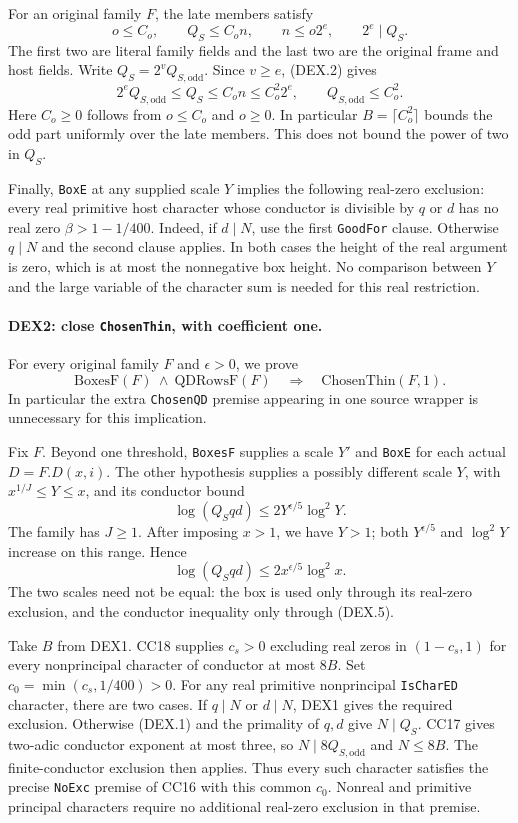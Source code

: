 \documentclass[11pt,a4paper]{article}
\numberwithin{equation}{section}
\theoremstyle{remark}\newtheorem{remark}[theorem]{Remark}
\begin{document}
For an original family $F$, the late members satisfy
\[
 o\le C_o,\qquad Q_S\le C_o n,\qquad
 n\le o2^e,\qquad 2^e\mid Q_S .                           \tag{DEX.2}
\]
The first two are literal family fields and the last two are the
original frame and host fields. Write $Q_S=2^vQ_{S,\mathrm{odd}}$.
Since $v\ge e$, (DEX.2) gives
\[
 2^eQ_{S,\mathrm{odd}}\le Q_S
       \le C_on\le C_o^2 2^e,
 \qquad Q_{S,\mathrm{odd}}\le C_o^2.                      \tag{DEX.3}
\]
Here $C_o\ge0$ follows from $o\le C_o$ and $o\ge0$.
In particular $B=\lceil C_o^2\rceil$ bounds the odd part uniformly
over the late members. This does not bound the power of two in $Q_S$.

Finally, \texttt{BoxE} at any supplied scale $Y$ implies the following
real-zero exclusion: every real primitive host character whose conductor
is divisible by $q$ or $d$ has no real zero $\beta>1-1/400$.
Indeed, if $d\mid N$, use the first \texttt{GoodFor} clause. Otherwise
$q\mid N$ and the second clause applies. In both cases the height of the
real argument is zero, which is at most the nonnegative box height.
No comparison between $Y$ and the large variable of the character sum is
needed for this real restriction.

\paragraph{DEX2: close \texttt{ChosenThin}, with coefficient one.}
\label{claim:DEX2}
For every original family $F$ and $\epsilon>0$, we prove
\[
 \mathrm{BoxesF}(F)\ \wedge\ \mathrm{QDRowsF}(F)
               \quad\Longrightarrow\quad
                         \mathrm{ChosenThin}(F,1).       \tag{DEX.4}
\]
In particular the extra \texttt{ChosenQD} premise appearing in one
source wrapper is unnecessary for this implication.

Fix $F$. Beyond one threshold, \texttt{BoxesF} supplies a scale $Y'$
and \texttt{BoxE} for each actual $D=F.D(x,i)$. The other hypothesis
supplies a possibly different scale $Y$, with
$x^{1/J}\le Y\le x$, and its conductor bound
\[
       \log(Q_Sqd)\le2Y^{\epsilon/5}\log^2Y.
\]
The family has $J\ge1$. After imposing $x>1$, we have $Y>1$;
both $Y^{\epsilon/5}$ and $\log^2Y$ increase on this range. Hence
\[
                     \log(Q_Sqd)
                         \le2x^{\epsilon/5}\log^2x.      \tag{DEX.5}
\]
The two scales need not be equal: the box is used only through its
real-zero exclusion, and the conductor inequality only through (DEX.5).

Take $B$ from DEX1. CC18 supplies $c_s>0$ excluding real zeros in
$(1-c_s,1)$ for every nonprincipal character of conductor at most $8B$.
Set $c_0=\min(c_s,1/400)>0$. For any real primitive nonprincipal
\texttt{IsCharED} character, there are two cases. If $q\mid N$ or
$d\mid N$, DEX1 gives the required exclusion. Otherwise (DEX.1) and
the primality of $q,d$ give $N\mid Q_S$. CC17 gives two-adic conductor
exponent at most three, so $N\mid8Q_{S,\mathrm{odd}}$ and $N\le8B$.
The finite-conductor exclusion then applies. Thus every such character
satisfies the precise \texttt{NoExc} premise of CC16 with this common
$c_0$. Nonreal and primitive principal characters require no additional
real-zero exclusion in that premise.
\end{document}
